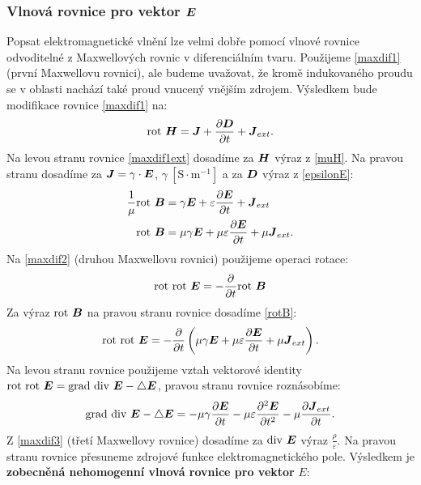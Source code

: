 \documentclass[12pt,a4paper,oneside]{article}
\numberwithin{equation}{section} %
\numberwithin{figure}{section} %
\numberwithin{table}{section} %
\renewcommand{\vec}[1]{\mbox{\boldmath$#1$}} %
\newcommand{\grad}{\mathrm{grad}\ }
\newcommand{\rot}{\mathrm{rot}\ }
\renewcommand{\div}{\mathrm{div}\ }
\begin{document}
\subsubsection*{Vlnová rovnice pro vektor $\vec{E}$}
Popsat elektromagnetické vlnění lze velmi dobře pomocí vlnové rovnice odvoditelné z Maxwellových rovnic v diferenciálním tvaru. Použijeme \ref{maxdif1} (první Maxwellovu rovnici), ale budeme uvažovat, že kromě indukovaného proudu se v oblasti nachází také proud vnucený vnějším zdrojem. Výsledkem bude modifikace rovnice \ref{maxdif1} na:
\begin{equation}
\label{maxdif1ext}
\rot \vec{H} = \vec{J} + \frac{\partial \vec{D}}{\partial t} + \vec{J} _{ext} .
\end{equation}
Na levou stranu rovnice \ref{maxdif1ext} dosadíme za $\vec{H}$ výraz z \ref{muH}. Na pravou stranu dosadíme za $\vec{J} = \gamma \cdot \vec{E}$, $\gamma ~\mathrm{[S \cdot m^{-1}]}$ a za $\vec{D}$ výraz z \ref{epsilonE}:
\begin{subequations}
\begin{align}
\frac{1}{\mu} \rot \vec{B} &= \gamma \vec{E} + \varepsilon \frac{\partial \vec{E}}{\partial t} + \vec{J} _{ext}
\\
\label{rotB}
\rot \vec{B} &= \mu \gamma \vec{E} + \mu \varepsilon \frac{\partial \vec{E}}{\partial t} + \mu \vec{J} _{ext} .
\end{align}
\end{subequations}
Na \ref{maxdif2} (druhou Maxwellovu rovnici) použijeme operaci rotace:
\begin{equation}
\rot \rot \vec{E} = - \frac{\partial}{\partial t} \rot \vec{B}
\end{equation}
Za výraz $\rot \vec{B}$ na pravou stranu rovnice dosadíme \ref{rotB}:
\begin{equation}
\rot \rot \vec{E} = - \frac{\partial}{\partial t} \left( \mu \gamma \vec{E} + \mu \varepsilon \frac{\partial \vec{E}}{\partial t} + \mu \vec{J} _{ext} \right) .
\end{equation}
Na levou stranu rovnice použijeme vztah vektorové identity $\rot \rot \vec{E} =  \grad \div \vec{E} - \triangle \vec{E}$, pravou stranu rovnice roznásobíme:
\begin{equation}
\grad \div \vec{E} - \triangle \vec{E} = - \mu \gamma \frac{\partial \vec{E}}{\partial t} - \mu \varepsilon \frac{\partial ^2 \vec{E}}{\partial t^2} - \mu \frac{\partial \vec{J} _{ext}}{\partial t} .
\end{equation}
Z \ref{maxdif3} (třetí Maxwellovy rovnice) dosadíme za $\div \vec{E}$ výraz $\frac{\rho}{\varepsilon}$. Na pravou stranu rovnice přesuneme zdrojové funkce elektromagnetického pole. Výsledkem je \textbf{zobecněná nehomogenní vlnová rovnice pro vektor} \vec{E}:
\end{document}

